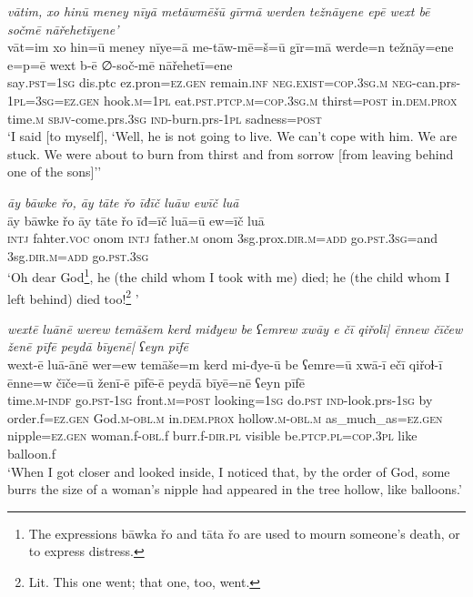 \ea \label{ZQ.25}
\textit{vātim, xo hinū meney nīyā metāwmēšū gīrmā werden težnāyene epē wext bē sočmē nāřehetīyene’} \\ 
\gll vāt=im xo hin=ū meney nīye=ā me-tāw-mē=š=ū gīr=mā werde=n težnāy=ene e=p=ē wext b-ē ∅-soč-mē nāřehetī=ene \\ 
 say\textsc{.pst}\textsc{=\textsc{1sg}} dis.ptc ez.pron\textsc{=ez.gen} remain\textsc{.inf} \textsc{\textsc{neg.}exist}\textsc{=cop}\textsc{.3sg}\textsc{.m} \textsc{neg-}can.prs\textsc{-\textsc{1pl}}\textsc{=3sg}\textsc{=ez.gen} hook\textsc{.m}\textsc{=\textsc{1pl}} eat\textsc{.pst}\textsc{.ptcp}\textsc{.m}\textsc{=cop}\textsc{.3sg}\textsc{.m} thirst\textsc{=\textsc{post}} in.\textsc{dem.prox} time\textsc{.m} \textsc{sbjv-}come.prs\textsc{.3sg} \textsc{ind-}burn.prs\textsc{-\textsc{1pl}} sadness\textsc{=\textsc{post}} \\ 
\glt `I said [to myself], ‘Well, he is not going to live. We can’t cope with him. We are stuck. We were about to burn from thirst and from sorrow [from leaving behind one of the sons]’'
\z 
 
\ea \label{ZQ.32}
\textit{āy bāwke řo, āy tāte řo īđīč luāw ewīč luā} \\ 
\gll āy bāwke řo āy tāte řo īđ=īč luā=ū ew=īč luā \\ 
 \textsc{intj} fahter.\textsc{voc} onom \textsc{intj} father\textsc{.m} onom 3sg.prox\textsc{.dir}\textsc{.m}\textsc{=add} go\textsc{.pst}\textsc{.3sg}=and 3sg\textsc{.dir}\textsc{.m}\textsc{=add} go\textsc{.pst}\textsc{.3sg} \\ 
\glt `Oh dear God\footnote{The expressions bāwka řo and tāta řo are used to mourn someone’s death, or to express distress.}, he (the child whom I took with me) died; he (the child whom I left behind) died too!\footnote{Lit. This one went; that one, too, went.} '
\z 
 
\ea \label{ZQ.39}
\textit{wextē luānē werew temāšem kerd miđyew be ʕemrew xwāy e čī qiřolī| ēnnew čīčew ženē pīfē peydā bīyenē| ʕeyn pīfē} \\ 
\gll wext-ē luā-ānē wer=ew temāše=m kerd mi-đye-ū be ʕemre=ū xwā-ī ečī qiřoɫ-ī ēnne=w čīče=ū ženī-ē pīfē-ē peydā bīyē=nē ʕeyn pīfē \\ 
 time\textsc{.m}\textsc{-indf} go\textsc{.pst}\textsc{-\textsc{1sg}} front\textsc{.m}\textsc{=\textsc{post}} looking\textsc{=\textsc{1sg}} do\textsc{.pst} \textsc{ind-}look.prs\textsc{-\textsc{1sg}} by order.f\textsc{=ez.gen} God\textsc{.m}\textsc{-obl}\textsc{.m} in.\textsc{dem.prox} hollow\textsc{.m}\textsc{-obl}\textsc{.m} as\_much\_as\textsc{=ez.gen} nipple\textsc{=ez.gen} woman.f\textsc{-obl}.f burr.f\textsc{-dir}\textsc{.pl} visible be\textsc{.ptcp}\textsc{.pl}\textsc{=cop}\textsc{.3pl} like balloon.f \\ 
\glt `When I got closer and looked inside, I noticed that, by the order of God, some burrs the size of a woman's nipple had appeared in the tree hollow, like balloons.'
\z 
 
